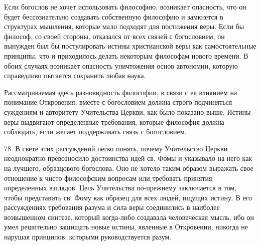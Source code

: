 \documentclass[a5paper,10pt]{article}
\begin{document}
Если богослов не хочет использовать философию, возникает опасность, что он
будет бессознательно создавать собственную философию и замкнется в структурах
мышления, которые мало подходят для постижения веры. Если бы философ, со своей
стороны, отказался от всех связей с богословием, он вынужден был бы
постулировать истины христианской веры как самостоятельные принципы, что и
приходилось делать некоторым философам нового времени. В обоих случаях
возникает опасность уничтожения основ автономии, которую справедливо пытается
сохранить любая наука.

Рассматриваемая здесь разновидность философии, в связи с ее влиянием на
понимание Откровения, вместе с богословием должна строго подчиняться суждениям
и авторитету Учительства Церкви, как было показано выше. Истины веры выдвигают
определенные требования, которые философия должна соблюдать, если желает
поддерживать связь с богословием.

78. В свете этих рассуждений легко понять, почему Учительство Церкви
неоднократно превозносило достоинства идей св. Фомы и указывало на него как на
лучшего, образцового богослова. Оно не хотело таким образом выражать свое
отношение к чисто философским вопросам или требовать принятия определенных
взглядов. Цель Учительства по-прежнему заключается в том, чтобы представить св.
Фому как образец для всех людей, ищущих истину. В его рассуждениях требования
разума и сила веры соединились в наиболее возвышенном синтезе, который
когда-либо создавала человеческая мысль, ибо он умел решительно защищать новые
истины, явленные в Откровении, никогда не нарушая принципов, которыми
руководствуется разум.
\end{document}
